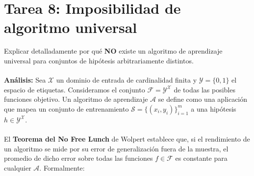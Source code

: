 \documentclass{article}
\begin{document}
\section{Tarea 8: Imposibilidad de algoritmo universal}
\noindent Explicar detalladamente por qué \textbf{NO} existe un algoritmo de aprendizaje universal para conjuntos de hipótesis arbitrariamente distintos. \\ \\
\textbf{Análisis:}
Sea $\mathcal{X}$ un dominio de entrada de cardinalidad finita y $\mathcal{Y} = \{0, 1\}$ el espacio de etiquetas. Consideramos el conjunto $\mathcal{F} = \mathcal{Y}^{\mathcal{X}}$ de todas las posibles funciones objetivo. Un algoritmo de aprendizaje $\mathcal{A}$ se define como una aplicación que mapea un conjunto de entrenamiento $\mathcal{S} = \{(x_i, y_i)\}_{i=1}^m$ a una hipótesis $h \in \mathcal{Y}^{\mathcal{X}}$. \\ \\
El \textbf{Teorema del No Free Lunch} de Wolpert establece que, si el rendimiento de un algoritmo se mide por su error de generalización fuera de la muestra, el promedio de dicho error sobre todas las funciones $f \in \mathcal{F}$ es constante para cualquier $\mathcal{A}$. Formalmente:
\end{document}

